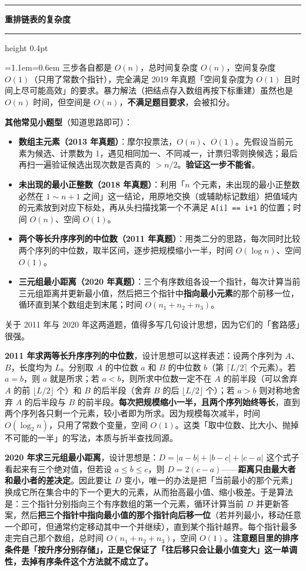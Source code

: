 \documentclass[11pt,openany,UTF8]{ctexbook}
\newcommand{\callouthead}[2]{%
  \par\addvspace{7pt}\noindent
  {\color{#1}\rule[-0.15em]{3pt}{1.05em}}\hspace{0.5em}%
  {\bfseries\color{#1}#2}\par\nobreak\vspace{-0.35em}%
  {\color{rulesep}\hrule height 0.4pt}\nobreak\vspace{0.45em}%
  \begingroup\small\setlength{\parindent}{0pt}%
  \leftskip=1.1em\rightskip=0.6em\noindent\ignorespaces}
\newcommand{\calloutend}{\par\endgroup\addvspace{7pt}}
\newenvironment{callkey}[1]{\callouthead{keybar}{#1}}{\calloutend}
\begin{document}
\begin{callkey}{重排链表的复杂度}
三步各自都是 $O(n)$，总时间复杂度 $O(n)$，空间复杂度 $O(1)$（只用了常数个指针），完全满足 2019 年真题「空间复杂度为 $O(1)$ 且时间上尽可能高效」的要求。暴力解法（把结点存入数组再按下标重建）虽然也是 $O(n)$ 时间，但空间是 $O(n)$，\textbf{不满足题目要求}，会被扣分。

\end{callkey}

\textbf{其他常见小题型}（知道思路即可）：

\begin{itemize}
\item \textbf{数组主元素（2013 年真题）}：摩尔投票法，$O(n)$、$O(1)$。先假设当前元素为候选、计票数为 1，遇见相同加一、不同减一，计票归零则换候选；最后再扫一遍验证候选出现次数是否真的 $> n/2$。\textbf{验证这一步不能省}。
\item \textbf{未出现的最小正整数（2018 年真题）}：利用「$n$ 个元素，未出现的最小正整数必然在 $1 \sim n+1$ 之间」这一结论，用原地交换（或辅助标记数组）把值域内的元素放到对应下标处，再从头扫描找第一个不满足 \texttt{A[i]\allowbreak{} =\allowbreak{}=\allowbreak{} i+\allowbreak{}1} 的位置；时间 $O(n)$、空间 $O(1)$。
\item \textbf{两个等长升序序列的中位数（2011 年真题）}：用类二分的思路，每次同时比较两个序列的中位数，取半区间，逐步把规模缩小一半，时间 $O(\log n)$、空间 $O(1)$。
\item \textbf{三元组最小距离（2020 年真题）}：三个有序数组各设一个指针，每次计算当前三元组距离并更新最小值，然后把三个指针中\textbf{指向最小元素}的那个前移一位，循环直到某个数组走到末尾；时间 $O(n_1+n_2+n_3)$。
\end{itemize}
关于 2011 年与 2020 年这两道题，值得多写几句设计思想，因为它们的「套路感」很强。

\textbf{2011 年求两等长升序序列的中位数}，设计思想可以这样表述：设两个序列为 $A$、$B$，长度均为 $L$。分别取 $A$ 的中位数 $a$ 和 $B$ 的中位数 $b$（第 $\lceil L/2 \rceil$ 个元素）。若 $a = b$，则 $a$ 就是所求；若 $a < b$，则所求中位数一定不在 $A$ 的前半段（可以舍弃 $A$ 的前 $\lfloor L/2 \rfloor$ 个）和 $B$ 的后半段（舍弃 $B$ 的后 $\lfloor L/2 \rfloor$ 个）；若 $a > b$ 则对称地舍弃 $A$ 的后半段与 $B$ 的前半段。\textbf{每次把规模缩小一半，且两个序列始终等长}，直到两个序列各只剩一个元素，较小者即为所求。因为规模每次减半，时间 $O(\log_2 n)$，只用了常数个变量，空间 $O(1)$。这类「取中位数、比大小、抛掉不可能的一半」的写法，本质与折半查找同源。

\textbf{2020 年求三元组最小距离}，设计思想是：$D = |a-b| + |b-c| + |c-a|$ 这个式子看起来有三个绝对值，但若设 $a \le b \le c$，则 $D = 2(c-a)$——\textbf{距离只由最大者和最小者的差决定}。因此要让 $D$ 变小，唯一的办法是把「当前最小的那个元素」换成它所在集合中的下一个更大的元素，从而抬高最小值、缩小极差。于是算法是：三个指针分别指向三个有序数组的第一个元素，循环计算当前 $D$ 并更新答案，然后\textbf{把三个指针中指向最小值的那个指针向后移一位}（若并列最小，移动任意一个即可，但通常约定移动其中一个并继续），直到某个指针越界。每个指针最多走完自己那个数组，总时间 $O(n_1+n_2+n_3)$，空间 $O(1)$。\textbf{注意题目里的排序条件是「按升序分别存储」，正是它保证了「往后移只会让最小值变大」这一单调性，去掉有序条件这个方法就不成立了。}
\end{document}
